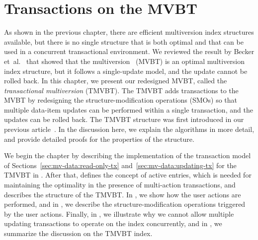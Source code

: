 \chapter{Transactions on the MVBT}
\label{chapter:tmvbt}
\label{def:tmvbt}

As shown in the previous chapter, there are efficient multiversion index
structures available, but there is no single structure that is both optimal
and that can be used in a concurrent transactional environment.  
We reviewed the result by Becker
et~al.~\cite{becker:1993:optimal,becker:1996:mvbt} that showed that the
multiversion \Btree~(MVBT) is an optimal multiversion index structure,
but it follows a single-update model, 
and the update cannot be rolled back.
In this chapter, we present our redesigned MVBT, called the
\emph{transactional multiversion \Btree} (TMVBT)\@.
The TMVBT adds transactions to the MVBT by redesigning the
structure-modification operations (SMOs) so that multiple data-item updates
can be performed within a single transaction, and the updates can be rolled
back.
The TMVBT structure was first introduced in our previous
article~\cite{haapasalo:2009:tmvbt}.
In the discussion here, we explain the algorithms in more detail, and provide
detailed proofs for the properties of the structure.

We begin the chapter by describing the implementation of the transaction
model of Sections~\ref{sec:mv-data:read-only-tx}
and~\ref{sec:mv-data:updating-tx} for the TMVBT in
.
After that,  defines the concept of active
entries, which is needed for maintaining the optimality in the presence of
multi-action transactions, and
 describes the structure of the TMVBT\@.
In , we show how the user actions are performed,
and in , we describe the structure-modification
operations triggered by the user actions.
Finally, in , we illustrate why we cannot
allow multiple updating transactions to operate on the index concurrently,
and in , we summarize the discussion on the TMVBT
index.


